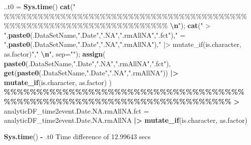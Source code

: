 \documentclass[
]{article}
\newenvironment{Shaded}{\begin{snugshade}}{\end{snugshade}}
\newcommand{\AttributeTok}[1]{\textcolor[rgb]{0.13,0.29,0.53}{#1}}
\newcommand{\ErrorTok}[1]{\textcolor[rgb]{0.64,0.00,0.00}{\textbf{#1}}}
\newcommand{\FloatTok}[1]{\textcolor[rgb]{0.00,0.00,0.81}{#1}}
\newcommand{\FunctionTok}[1]{\textcolor[rgb]{0.13,0.29,0.53}{\textbf{#1}}}
\newcommand{\NormalTok}[1]{#1}
\newcommand{\OtherTok}[1]{\textcolor[rgb]{0.56,0.35,0.01}{#1}}
\newcommand{\SpecialCharTok}[1]{\textcolor[rgb]{0.81,0.36,0.00}{\textbf{#1}}}
\newcommand{\StringTok}[1]{\textcolor[rgb]{0.31,0.60,0.02}{#1}}
\begin{document}
\begin{Shaded}
\begin{Highlighting}[]
  
\NormalTok{..t0 }\OtherTok{=} \FunctionTok{Sys.time}\NormalTok{()}
\FunctionTok{cat}\NormalTok{(}\StringTok{"    \%\%\%\%\%\%\%\%\%\%\%\%\%\%\%\%\%\%\%\%\%\%\%\%\%\%\%\%\%\%\%\%\%\%\%\%\%\%\%\%\%\%\%\%\%\%\%\%\%\%\%\%\%\%\%\%\%\%\%\%\%\%\%\%\%\%\%\%\%\%\%\%    }\SpecialCharTok{\textbackslash{}n}\StringTok{"}\NormalTok{); }\FunctionTok{cat}\NormalTok{(}\StringTok{" \textgreater{} "}\NormalTok{,}\FunctionTok{paste0}\NormalTok{(.DataSetName,}\StringTok{".Date"}\NormalTok{,}\StringTok{".NA"}\NormalTok{,}\StringTok{".rmAllNA"}\NormalTok{,}\StringTok{".fct"}\NormalTok{),}\StringTok{" = "}\NormalTok{,}\FunctionTok{paste0}\NormalTok{(.DataSetName,}\StringTok{".Date"}\NormalTok{,}\StringTok{".NA"}\NormalTok{,}\StringTok{".rmAllNA"}\NormalTok{),}\StringTok{" |\textgreater{} mutate\_if(is.character, as.factor)"}\NormalTok{,}\StringTok{"  }\SpecialCharTok{\textbackslash{}n}\StringTok{"}\NormalTok{, }\AttributeTok{sep=}\StringTok{""}\NormalTok{); }\FunctionTok{assign}\NormalTok{( }\FunctionTok{paste0}\NormalTok{(.DataSetName,}\StringTok{".Date"}\NormalTok{,}\StringTok{".NA"}\NormalTok{,}\StringTok{".rmAllNA"}\NormalTok{,}\StringTok{".fct"}\NormalTok{), }\FunctionTok{get}\NormalTok{(}\FunctionTok{paste0}\NormalTok{(.DataSetName,}\StringTok{".Date"}\NormalTok{,}\StringTok{".NA"}\NormalTok{,}\StringTok{".rmAllNA"}\NormalTok{)) }\SpecialCharTok{|\textgreater{}} \FunctionTok{mutate\_if}\NormalTok{(is.character, as.factor) )}
    \SpecialCharTok{\%\%\%\%\%\%\%\%\%\%\%\%\%\%\%\%\%\%\%\%\%\%\%\%\%\%\%\%\%\%\%\%\%\%\%\%\%\%\%\%\%\%\%\%\%\%\%\%\%\%\%\%\%\%\%\%\%\%\%\%\%\%\%\%\%\%\%\%\%\%\%\%}    
 \ErrorTok{\textgreater{}}\NormalTok{ analyticDF\_time2event.Date.NA.rmAllNA.fct }\OtherTok{=}\NormalTok{ analyticDF\_time2event.Date.NA.rmAllNA }\SpecialCharTok{|\textgreater{}} \FunctionTok{mutate\_if}\NormalTok{(is.character, as.factor)  }
\end{Highlighting}
\end{Shaded}

\begin{Shaded}
\begin{Highlighting}[]
\FunctionTok{Sys.time}\NormalTok{() }\SpecialCharTok{{-}}\NormalTok{ .t0}
\NormalTok{Time difference of }\FloatTok{12.99643}\NormalTok{ secs}
\end{Highlighting}
\end{Shaded}
\end{document}
